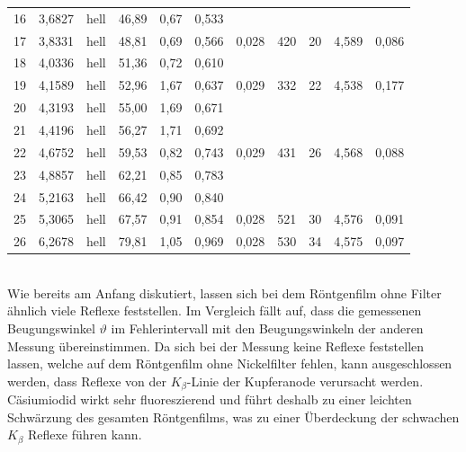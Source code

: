 \documentclass[a4paper,twoside,final]{article}
\begin{document}
\begin{table}[ht]
\begin{tabular}{l c c c c c | c c c c c }
    16 & 3,6827 & hell         & 46,89 & 0,67 & 0,533 &       &     &    &       &       \\
    17 & 3,8331 & hell         & 48,81 & 0,69 & 0,566 & 0,028 & 420 & 20 & 4,589 & 0,086 \\
    18 & 4,0336 & hell         & 51,36 & 0,72 & 0,610 &       &     &    &       &       \\
    19 & 4,1589 & hell         & 52,96 & 1,67 & 0,637 & 0,029 & 332 & 22 & 4,538 & 0,177 \\
    20 & 4,3193 & hell         & 55,00 & 1,69 & 0,671 &       &     &    &       &       \\
    21 & 4,4196 & hell         & 56,27 & 1,71 & 0,692 &       &     &    &       &       \\
    22 & 4,6752 & hell         & 59,53 & 0,82 & 0,743 & 0,029 & 431 & 26 & 4,568 & 0,088 \\
    23 & 4,8857 & hell         & 62,21 & 0,85 & 0,783 &       &     &    &       &       \\
    24 & 5,2163 & hell         & 66,42 & 0,90 & 0,840 &       &     &    &       &       \\
    25 & 5,3065 & hell         & 67,57 & 0,91 & 0,854 & 0,028 & 521 & 30 & 4,576 & 0,091 \\
    26 & 6,2678 & hell         & 79,81 & 1,05 & 0,969 & 0,028 & 530 & 34 & 4,575 & 0,097
	\end{tabular}
\end{table}\\
Wie bereits am Anfang diskutiert, lassen sich bei dem Röntgenfilm ohne Filter ähnlich viele Reflexe feststellen. Im Vergleich fällt auf, dass die gemessenen Beugungswinkel $\vartheta$ im Fehlerintervall mit den Beugungswinkeln der anderen Messung übereinstimmen. Da sich bei der Messung keine Reflexe feststellen lassen, welche auf dem Röntgenfilm ohne Nickelfilter fehlen, kann ausgeschlossen werden, dass Reflexe von der $K_\beta$-Linie der Kupferanode verursacht werden.\\
Cäsiumiodid wirkt sehr fluoreszierend und führt deshalb zu einer leichten Schwärzung des gesamten Röntgenfilms, was zu einer Überdeckung der schwachen $K_\beta$ Reflexe führen kann.
\FloatBarrier
\end{document}
